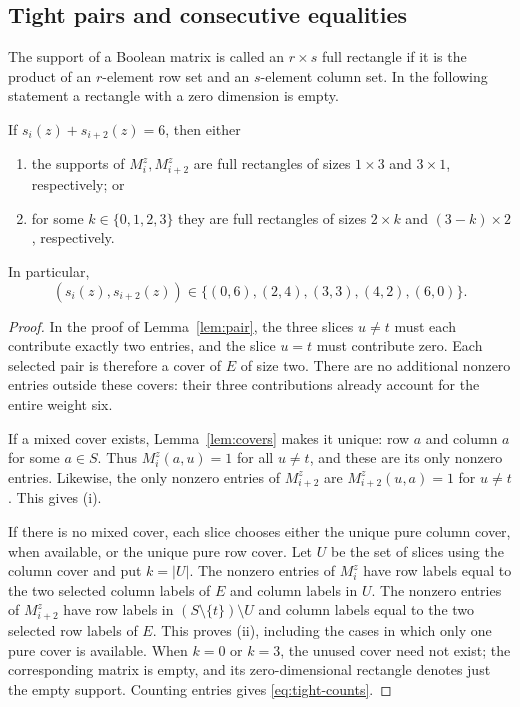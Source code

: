 \subsection{Tight pairs and consecutive equalities}
The support of a Boolean matrix is called an $r\times s$ full rectangle
if it is the product of an $r$-element row set and an $s$-element column
set. In the following statement a rectangle with a zero dimension is empty.

\begin{lemma}\label{lem:tight}
If $s_i(z)+s_{i+2}(z)=6$, then either
\begin{enumerate}
\item the supports of $M_i^z,M_{i+2}^z$ are full rectangles of sizes
$1\times3$ and $3\times1$, respectively; or
\item for some $k\in\{0,1,2,3\}$ they are full rectangles of sizes
$2\times k$ and $(3-k)\times2$, respectively.
\end{enumerate}
In particular,
\begin{equation}\label{eq:tight-counts}
(s_i(z),s_{i+2}(z))\in\{(0,6),(2,4),(3,3),(4,2),(6,0)\}.
\end{equation}
\end{lemma}
\begin{proof}
In the proof of Lemma~\ref{lem:pair}, the three slices $u\ne t$ must each
contribute exactly two entries, and the slice $u=t$ must contribute zero.
Each selected pair is therefore a cover of $E$ of size two.
There are no additional nonzero entries outside these covers: their
three contributions already account for the entire weight six.

If a mixed cover exists, Lemma~\ref{lem:covers} makes it unique: row $a$
and column $a$ for some $a\in S$. Thus $M_i^z(a,u)=1$ for all $u\ne t$,
and these are its only nonzero entries. Likewise, the only nonzero entries
of $M_{i+2}^z$ are $M_{i+2}^z(u,a)=1$ for $u\ne t$. This gives (i).

If there is no mixed cover, each slice chooses either the unique pure
column cover, when available, or the unique pure row cover. Let $U$ be the
set of slices using the column cover and put $k=|U|$. The nonzero entries
of $M_i^z$ have row labels equal to the two selected column labels of $E$
and column labels in $U$. The nonzero entries of $M_{i+2}^z$ have row
labels in $(S\setminus\{t\})\setminus U$ and column labels equal to the
two selected row labels of $E$. This proves (ii), including the cases in
which only one pure cover is available. When $k=0$ or $k=3$, the
unused cover need not exist; the corresponding matrix is empty, and
its zero-dimensional rectangle denotes just the empty support.
Counting entries gives
\eqref{eq:tight-counts}.
\end{proof}

